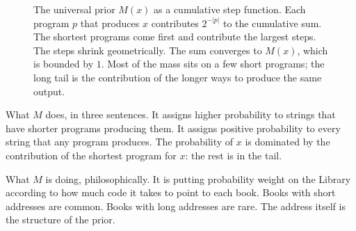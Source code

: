 \begin{figure}[h]
\centering
{}
\caption{The universal prior $M(x)$ as a cumulative step function. Each program $p$ that produces $x$ contributes $2^{-|p|}$ to the cumulative sum. The shortest programs come first and contribute the largest steps. The steps shrink geometrically. The sum converges to $M(x)$, which is bounded by $1$. Most of the mass sits on a few short programs; the long tail is the contribution of the longer ways to produce the same output.}
\label{fig:universal-prior}
\end{figure}

What $M$ does, in three sentences. It assigns higher probability to strings that have shorter programs producing them. It assigns positive probability to every string that any program produces. The probability of $x$ is dominated by the contribution of the shortest program for $x$: the rest is in the tail.

What $M$ is doing, philosophically. It is putting probability weight on the Library according to how much code it takes to point to each book. Books with short addresses are common. Books with long addresses are rare. The address itself is the structure of the prior.

